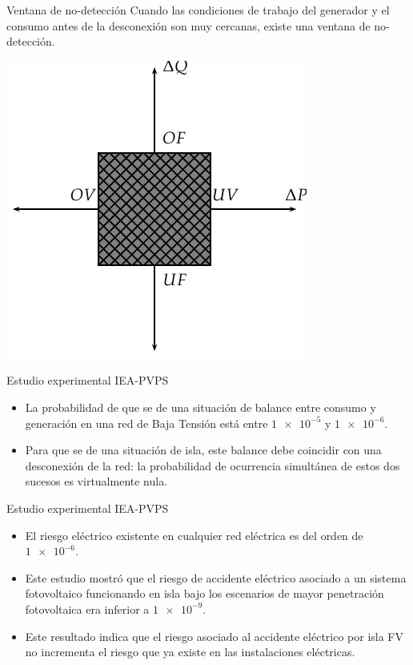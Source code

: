 \documentclass[xcolor={usenames,svgnames,dvipsnames}]{beamer}
\begin{document}
\begin{frame}[label=sec-2-6-4]{Ventana de no-detección}
Cuando las condiciones de trabajo del generador y el consumo antes de la
desconexión son muy cercanas, existe una ventana de no-detección.

\includegraphics[width=.9\linewidth]{../figs/NDZ.pdf}
\end{frame}

\begin{frame}[label=sec-2-6-5]{Estudio experimental IEA-PVPS}
\begin{itemize}
\item La probabilidad de que se de una situación de balance entre consumo y
generación en una red de Baja Tensión está entre $\num{1e-5}$ y
$\num{1e-6}$.

\item Para que se de una situación de isla, este balance debe coincidir con
una desconexión de la red: la probabilidad de ocurrencia simultánea
de estos dos sucesos es virtualmente nula.
\end{itemize}
\end{frame}

\begin{frame}[label=sec-2-6-6]{Estudio experimental IEA-PVPS}
\begin{itemize}
\item El riesgo eléctrico existente en cualquier red eléctrica es del orden
de $\num{1e-6}$.

\item Este estudio mostró que el riesgo de accidente eléctrico asociado a
un sistema fotovoltaico funcionando en isla bajo los escenarios de
mayor penetración fotovoltaica era inferior a $\num{1e-9}$.

\item Este resultado indica que el riesgo asociado al accidente eléctrico
por isla FV no incrementa el riesgo que ya existe en las
instalaciones eléctricas.
\end{itemize}
\end{frame}
\end{document}
